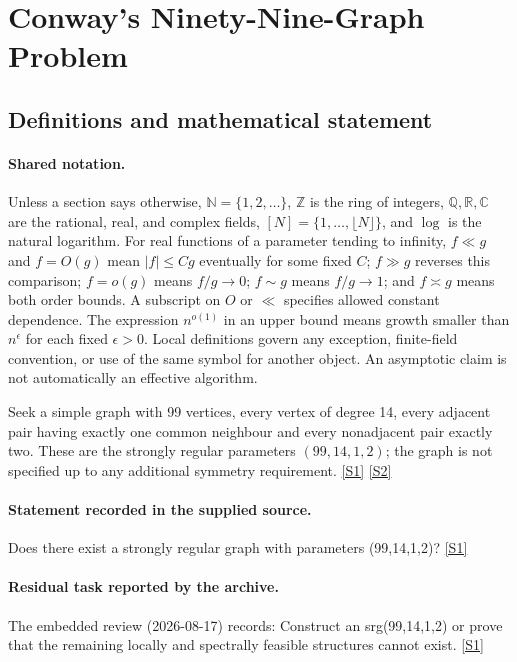 \documentclass[11pt,a4paper]{article}
\newcommand{\N}{\mathbb{N}}
\newcommand{\Z}{\mathbb{Z}}
\newcommand{\Q}{\mathbb{Q}}
\newcommand{\R}{\mathbb{R}}
\newcommand{\C}{\mathbb{C}}
\newcommand{\sref}[2]{\hyperlink{source:#1:#2}{[S#2]}}
\begin{document}
\section{Conway’s Ninety-Nine-Graph Problem}\label{statement}


\subsection{Definitions and mathematical statement}

\paragraph{Shared notation.}Unless a section says otherwise, $\N=\{1,2,\ldots\}$,
$\Z$ is the ring of integers, $\Q,\R,\C$ are the rational, real, and complex
fields, $[N]=\{1,\ldots,\lfloor N\rfloor\}$, and $\log$ is the natural
logarithm. For real functions of a parameter tending to infinity,
$f\ll g$ and $f=O(g)$ mean $|f|\leq Cg$ eventually for some fixed $C$;
$f\gg g$ reverses this comparison; $f=o(g)$ means $f/g\to0$;
$f\sim g$ means $f/g\to1$; and $f\asymp g$ means both order bounds.
A subscript on $O$ or $\ll$ specifies allowed constant dependence.
The expression $n^{o(1)}$ in an upper bound means growth smaller than
$n^\epsilon$ for each fixed $\epsilon>0$. Local definitions govern any
exception, finite-field convention, or use of the same symbol for another
object. An asymptotic claim is not automatically an effective algorithm.



Seek a simple graph with 99 vertices, every vertex of degree 14, every adjacent pair having exactly one common neighbour and every nonadjacent pair exactly two. These are the strongly regular parameters $(99,14,1,2)$; the graph is not specified up to any additional symmetry requirement. \sref{statement}{1} \sref{statement}{2}

\paragraph{Statement recorded in the supplied source.}
Does there exist a strongly regular graph with parameters (99,14,1,2)? \sref{statement}{1}

\paragraph{Residual task reported by the archive.}

The embedded review (2026-08-17) records: Construct an srg(99,14,1,2) or prove that the remaining locally and spectrally feasible structures cannot exist. \sref{statement}{1}
\end{document}
